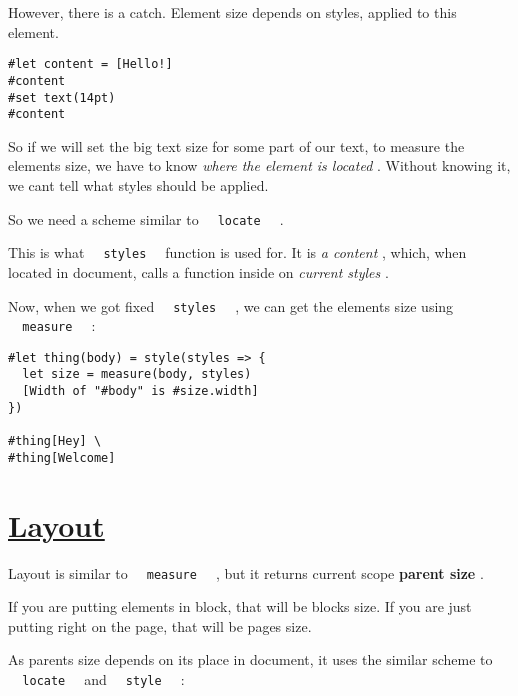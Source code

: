 However, there is a catch. Element size depends on styles, applied to
this element.

\begin{verbatim}
#let content = [Hello!]
#content
#set text(14pt)
#content
\end{verbatim}

\pandocbounded{}

So if we will set the big text size for some part of our text, to
measure the element\textquotesingle s size, we have to know \emph{where
the element is located} . Without knowing it, we can\textquotesingle t
tell what styles should be applied.

So we need a scheme similar to
\texttt{\ }{\texttt{\ locate\ }}\texttt{\ } .

This is what \texttt{\ }{\texttt{\ styles\ }}\texttt{\ } function is
used for. It is \emph{a content} , which, when located in document,
calls a function inside on \emph{current styles} .

Now, when we got fixed \texttt{\ }{\texttt{\ styles\ }}\texttt{\ } , we
can get the element\textquotesingle s size using
\texttt{\ }{\texttt{\ measure\ }}\texttt{\ } :

\begin{verbatim}
#let thing(body) = style(styles => {
  let size = measure(body, styles)
  [Width of "#body" is #size.width]
})

#thing[Hey] \
#thing[Welcome]
\end{verbatim}

\pandocbounded{}

\section{\texorpdfstring{\hyperref[layout]{Layout}}{Layout}}\label{layout}

Layout is similar to \texttt{\ }{\texttt{\ measure\ }}\texttt{\ } , but
it returns current scope \textbf{parent size} .

If you are putting elements in block, that will be
block\textquotesingle s size. If you are just putting right on the page,
that will be page\textquotesingle s size.

As parent\textquotesingle s size depends on it\textquotesingle s place
in document, it uses the similar scheme to
\texttt{\ }{\texttt{\ locate\ }}\texttt{\ } and
\texttt{\ }{\texttt{\ style\ }}\texttt{\ } :


